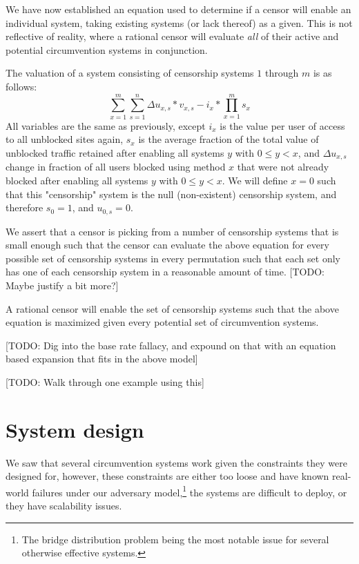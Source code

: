 \documentclass[12pt]{report}
\begin{document}
We have now established an equation used to determine if a censor will enable an individual system, taking existing systems (or lack thereof) as a given. This is not reflective of reality, where a rational censor will evaluate \emph{all} of their active and potential circumvention systems in conjunction.

The valuation of a system consisting of censorship systems $1$ through $m$ is as follows:
\begin{equation}
\sum_{x=1}^{m}\sum_{s=1}^{n}\Delta u_{x,s}*v_{x,s} - i_{x} * \prod_{x=1}^{m}s_x
\end{equation}
All variables are the same as previously, except $i_x$ is the value per user of access to all unblocked sites again, $s_x$ is the average fraction of the total value of unblocked traffic retained after enabling all systems $y$ with $0\leq y<x$, and $\Delta  u_{x,s}$ change in fraction of all users blocked using method $x$ that were not already blocked after enabling all systems $y$ with $0\leq y<x$. We will define $x=0$ such that this "censorship" system is the null (non-existent) censorship system, and therefore $s_0 = 1$, and $u_{0,s} = 0$.

We assert that a censor is picking from a number of censorship systems that is small enough such that the censor can evaluate the above equation for every possible set of censorship systems in every permutation such that each set only has one of each censorship system in a reasonable amount of time. [TODO: Maybe justify a bit more?]

A rational censor will enable the set of censorship systems such that the above equation is maximized given every potential set of circumvention systems.

[TODO: Dig into the base rate fallacy, and expound on that with an equation based expansion that fits in the above model]

[TODO: Walk through one example using this]

\chapter{System design}

We saw that several circumvention systems work given the constraints they were designed for, however, these constraints are either too loose and have known real-world failures under our adversary model,\footnote{The bridge distribution problem being the most notable issue for several otherwise effective systems.} the systems are difficult to deploy, or they have scalability issues.
\end{document}

